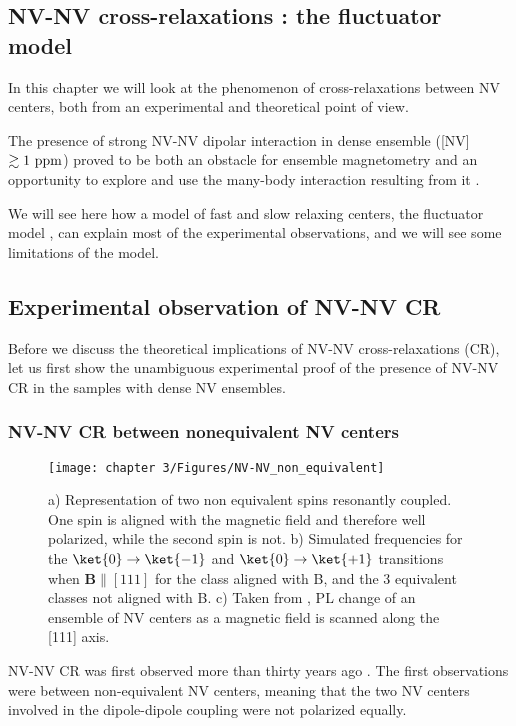 \documentclass[a4paper,11pt]{report}
\begin{document}
 \begin{refsection}

\chapter{NV-NV cross-relaxations : the fluctuator model}
In this chapter we will look at the phenomenon of cross-relaxations between NV centers, both from an experimental and theoretical point of view. 

The presence of strong NV-NV dipolar interaction in dense ensemble ([NV] $\gtrsim 1\ \rm ppm$) proved to be both an obstacle for ensemble magnetometry \citep{zhou2020quantum} and an opportunity to explore and use the many-body interaction resulting from it \citep{zhou2020quantum, choi2017observation, kucsko2018critical, zu2021emergent}.

We will see here how a model of fast and slow relaxing centers, the fluctuator model \citep{choi2017depolarization}, can explain most of the experimental observations, and we will see some limitations of the model.

\section{Experimental observation of NV-NV CR}
Before we discuss the theoretical implications of NV-NV cross-relaxations (CR), let us first show the unambiguous experimental proof of the presence of NV-NV CR in the samples with dense NV ensembles.
\subsection{NV-NV CR between nonequivalent NV centers}
\label{non_equi_valent_CR}
\begin{figure}[h]
\centering
\texttt{[image: chapter 3/Figures/NV-NV\_non\_equivalent]}
\caption{a) Representation of two non equivalent spins resonantly coupled. One spin is aligned with the magnetic field and therefore well polarized, while the second spin is not. b) Simulated frequencies for the $\ket{0} \to \ket{-1}$ and $\ket{0} \to \ket{+1}$ transitions when $\mathbf{B}\parallel [111]$ for the class aligned with B, and the 3 equivalent classes not aligned with B. c) Taken from \citep{armstrong2010nv}, PL change of an ensemble of NV centers as a magnetic field is scanned along the [111] axis.}
\label{non equivalent NV-NV}
\end{figure}
NV-NV CR was first observed more than thirty years ago \citep{holliday1989optical, van1989cross}. The first observations were between non-equivalent NV centers, meaning that the two NV centers involved in the dipole-dipole coupling were not polarized equally.


\end{refsection}
\end{document}
